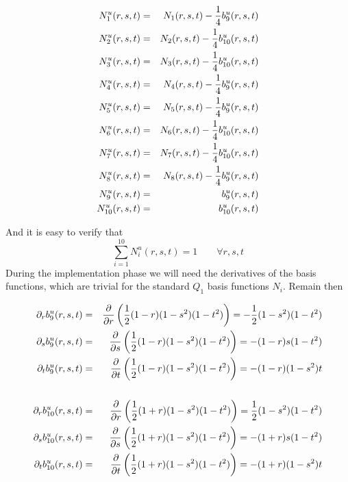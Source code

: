 \begin{mdframed}[backgroundcolor=blue!5]
\begin{eqnarray}
{N}_1^u(r,s,t) &=&  N_1(r,s,t) - \frac{1}{4} b_9^u(r,s,t)\nonumber\\
{N}_2^u(r,s,t) &=&  N_2(r,s,t) - \frac{1}{4} b_{10}^u(r,s,t)\nonumber\\
{N}_3^u(r,s,t) &=&  N_3(r,s,t) - \frac{1}{4} b_{10}^u(r,s,t)\nonumber\\
{N}_4^u(r,s,t) &=&  N_4(r,s,t) - \frac{1}{4} b_9^u(r,s,t)\nonumber\\
{N}_5^u(r,s,t) &=&  N_5(r,s,t) - \frac{1}{4} b_9^u(r,s,t)\nonumber\\
{N}_6^u(r,s,t) &=&  N_6(r,s,t) - \frac{1}{4} b_{10}^u(r,s,t)\nonumber\\
{N}_7^u(r,s,t) &=&  N_7(r,s,t) - \frac{1}{4} b_{10}^u(r,s,t)\nonumber\\
{N}_8^u(r,s,t) &=&  N_8(r,s,t) - \frac{1}{4} b_9^u(r,s,t)\nonumber\\
{N}_9^u(r,s,t) &=&  b_9^u(r,s,t)\nonumber\\
{N}_{10}^u(r,s,t) &=&  b_{10}^u(r,s,t) \nonumber
\end{eqnarray}
\end{mdframed}
And it is easy to verify that  
\[
\sum_{i=1}^{10} {N}_i^u(r,s,t) = 1  \qquad \forall r,s,t
\]
During the implementation phase we will need the derivatives of the basis functions, 
which are trivial for the standard $Q_1$ basis functions $N_i$. Remain then 


\begin{eqnarray}
\partial_r b_9^u(r,s,t) 
&=& \frac{\partial }{\partial r}  \left( \frac{1}{2}(1-r)(1-s^2)(1-t^2) \right) 
=  -\frac{1}{2}(1-s^2)(1-t^2)  \nonumber\\
\partial_s b_9^u(r,s,t) 
&=& \frac{\partial }{\partial s}  \left( \frac{1}{2}(1-r)(1-s^2)(1-t^2) \right) 
=  -(1-r)s(1-t^2)  \nonumber\\
\partial_t b_9^u(r,s,t) 
&=& \frac{\partial }{\partial t}  \left( \frac{1}{2}(1-r)(1-s^2)(1-t^2) \right) 
=  -(1-r)(1-s^2)t  \nonumber\\ \nonumber\\
\partial_r b_{10}^u(r,s,t) 
&=& \frac{\partial }{\partial r}  \left( \frac{1}{2}(1+r)(1-s^2)(1-t^2) \right) 
=  \frac{1}{2}(1-s^2)(1-t^2)  \nonumber\\
\partial_s b_{10}^u(r,s,t) 
&=& \frac{\partial }{\partial s}  \left( \frac{1}{2}(1+r)(1-s^2)(1-t^2) \right) 
=  -(1+r)s(1-t^2)  \nonumber\\
\partial_t b_{10}^u(r,s,t) 
&=& \frac{\partial }{\partial t}  \left( \frac{1}{2}(1+r)(1-s^2)(1-t^2) \right) 
=  -(1+r)(1-s^2)t  \nonumber
\end{eqnarray}

